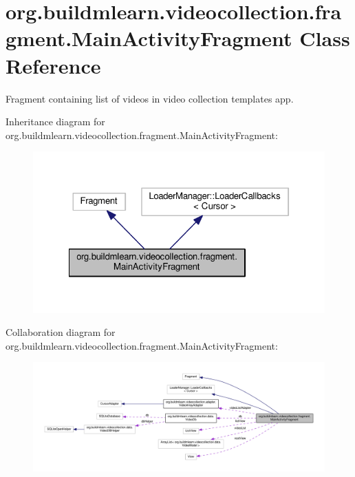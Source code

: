 \hypertarget{classorg_1_1buildmlearn_1_1videocollection_1_1fragment_1_1MainActivityFragment}{}\section{org.\+buildmlearn.\+videocollection.\+fragment.\+Main\+Activity\+Fragment Class Reference}
\label{classorg_1_1buildmlearn_1_1videocollection_1_1fragment_1_1MainActivityFragment}


Fragment containing list of videos in video collection template\textquotesingle{}s app.  




Inheritance diagram for org.\+buildmlearn.\+videocollection.\+fragment.\+Main\+Activity\+Fragment\+:
\nopagebreak
\begin{figure}[H]
\begin{center}
\leavevmode
\includegraphics[width=322pt]{classorg_1_1buildmlearn_1_1videocollection_1_1fragment_1_1MainActivityFragment__inherit__graph}
\end{center}
\end{figure}


Collaboration diagram for org.\+buildmlearn.\+videocollection.\+fragment.\+Main\+Activity\+Fragment\+:
\nopagebreak
\begin{figure}[H]
\begin{center}
\leavevmode
\includegraphics[width=350pt]{classorg_1_1buildmlearn_1_1videocollection_1_1fragment_1_1MainActivityFragment__coll__graph}
\end{center}
\end{figure}
